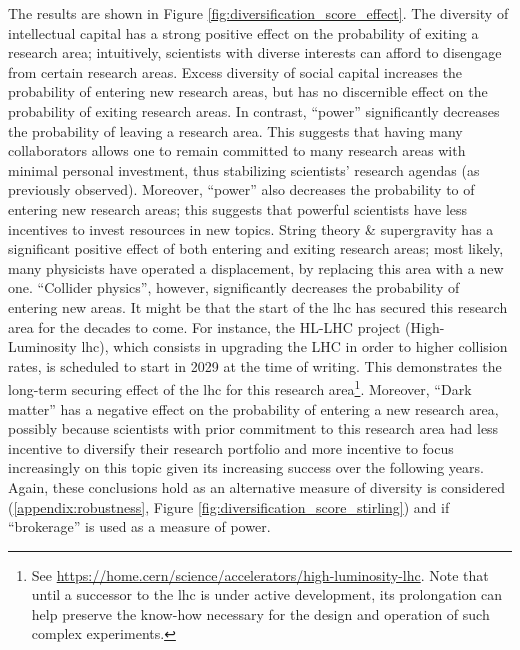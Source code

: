 \documentclass{article}
\begin{document}
The results are shown in Figure \ref{fig:diversification_score_effect}. The diversity of intellectual capital has a strong positive effect on the probability of exiting a research area; intuitively, scientists with diverse interests can afford to disengage from certain research areas. Excess diversity of social capital increases the probability of entering new research areas, but has no discernible effect on the probability of exiting research areas. In contrast, ``power'' significantly decreases the probability of leaving a research area. This suggests that having many collaborators allows one to remain committed to many research areas with minimal personal investment, thus stabilizing scientists' research agendas (as previously observed). Moreover, ``power'' also decreases the probability to of entering new research areas; this suggests that powerful scientists have less incentives to invest resources in new topics. String theory \& supergravity has a significant positive effect of both entering and exiting research areas; most likely, many physicists have operated a displacement, by replacing this area with a new one. ``Collider physics'', however, significantly decreases the probability of entering new areas. It might be that the start of the \gls{lhc} has secured this research area for the decades to come. %
For instance, the HL-LHC project (High-Luminosity \gls{lhc}), which consists in upgrading the LHC in order to higher collision rates, is scheduled to start in 2029 at the time of writing. This demonstrates the long-term securing effect of the \gls{lhc} for this research area\footnote{See \url{https://home.cern/science/accelerators/high-luminosity-lhc}. Note that until a successor to the \gls{lhc} is under active development, its prolongation can help preserve the know-how necessary for the design and operation of such complex experiments. }. Moreover, ``Dark matter'' has a negative effect on the probability of entering a new research area, possibly because scientists with prior commitment to this research area had less incentive to diversify their research portfolio and more incentive to focus increasingly on this topic given its increasing success over the following years. Again, these conclusions hold as an alternative measure of diversity is considered (\ref{appendix:robustness}, Figure \ref{fig:diversification_score_stirling}) and if ``brokerage'' is used as a measure of power.
 
\end{document}
